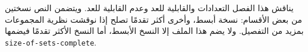 \documentclass[../../../include/open-logic-chapter]{subfiles}
\begin{document}

\begin{editorial}
يناقش هذا الفصل التعدادات والقابلية للعد وعدم القابلية للعد. ويتضمن
النص نسختين من بعض الأقسام: نسخة أبسط، وأخرى أكثر تقدمًا تصلح إذا
نوقشت نظرية المجموعات بمزيد من التفصيل. ولا يضم هذا الملف إلا النسخ
الأبسط، أما النسخ الأكثر تقدمًا فيضمها
\verb|size-of-sets-complete|.
\end{editorial}











\OLEndChapterHook
\end{document}
